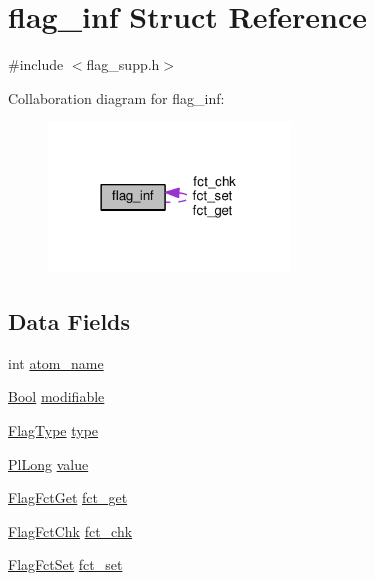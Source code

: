 \hypertarget{structflag__inf}{}\section{flag\+\_\+inf Struct Reference}
\label{structflag__inf}


{\ttfamily \#include $<$flag\+\_\+supp.\+h$>$}



Collaboration diagram for flag\+\_\+inf\+:\nopagebreak
\begin{figure}[H]
\begin{center}
\leavevmode
\includegraphics[width=182pt]{structflag__inf__coll__graph}
\end{center}
\end{figure}
\subsection*{Data Fields}
\begin{DoxyCompactItemize}
\item 
int \hyperlink{structflag__inf_a7131c7e545b44d7086d50a89e76bbf30}{atom\+\_\+name}
\item 
\hyperlink{bool_8h_afdcfe6db5bea87bd493a3fe2c513d5ef}{Bool} \hyperlink{structflag__inf_ac95236097fb4811ec47198aa34e64d15}{modifiable}
\item 
\hyperlink{flag__supp_8h_a829563b1e19fae59f905c1afb76fe4eb}{Flag\+Type} \hyperlink{structflag__inf_ad1ffc264915a45e9395b717849c36ff9}{type}
\item 
\hyperlink{gprolog_8h_a4d005b136d7fb28537eb1815f7868b63}{Pl\+Long} \hyperlink{structflag__inf_a828f0d058950ff9e708080d5e96b4068}{value}
\item 
\hyperlink{flag__supp_8h_a54ea5be77d71f1b9cb6e175bea45179c}{Flag\+Fct\+Get} \hyperlink{structflag__inf_ab4585a2020aa37259cb1117664fecfee}{fct\+\_\+get}
\item 
\hyperlink{flag__supp_8h_ac0c2714190598d0ff723cfc7b88b41cd}{Flag\+Fct\+Chk} \hyperlink{structflag__inf_a46997cf1af90c40fa0e2ecee11b935d7}{fct\+\_\+chk}
\item 
\hyperlink{flag__supp_8h_a848a192d7dbb0e8b3715f9322291de21}{Flag\+Fct\+Set} \hyperlink{structflag__inf_aa01403feaa709ffaa582224b5789b928}{fct\+\_\+set}
\end{DoxyCompactItemize}


